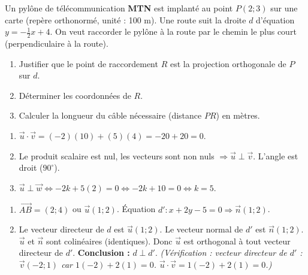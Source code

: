 \documentclass[11pt]{article}
\begin{document}
\begin{exercice}
Un pylône de télécommunication \textbf{MTN} est implanté au point $P(2; 3)$ sur une carte (repère orthonormé, unité : 100 m). Une route suit la droite $d$ d'équation $y = -\frac{1}{2}x + 4$. On veut raccorder le pylône à la route par le chemin le plus court (perpendiculaire à la route).
\begin{enumerate}
    \item Justifier que le point de raccordement $R$ est la projection orthogonale de $P$ sur $d$.
    \item Déterminer les coordonnées de $R$.
    \item Calculer la longueur du câble nécessaire (distance $PR$) en mètres.
\end{enumerate}
\end{exercice}

\begin{corrige}[Exercice 1]
\begin{enumerate}
    \item $\vec{u} \cdot \vec{v} = (-2)(10) + (5)(4) = -20 + 20 = 0$.
    \item Le produit scalaire est nul, les vecteurs sont non nuls $\Rightarrow \vec{u} \perp \vec{v}$. L'angle est droit ($90^\circ$).
    \item $\vec{u} \perp \vec{w} \iff -2k + 5(2) = 0 \iff -2k + 10 = 0 \iff k = 5$.
\end{enumerate}
\end{corrige}

\begin{corrige}[Exercice 2]
\begin{enumerate}
    \item $\overrightarrow{AB} = (2; 4)$ ou $\vec{u}(1; 2)$. Équation $d' : x + 2y - 5 = 0 \Rightarrow \vec{n}(1; 2)$.
    \item Le vecteur directeur de $d$ est $\vec{u}(1;2)$. Le vecteur normal de $d'$ est $\vec{n}(1;2)$.
    $\vec{u}$ et $\vec{n}$ sont colinéaires (identiques). Donc $\vec{u}$ est orthogonal à tout vecteur directeur de $d'$.
    \textbf{Conclusion :} $d \perp d'$.
    \emph{(Vérification : vecteur directeur de $d'$ : $\vec{v}(-2; 1)$ car $1(-2)+2(1)=0$. $\vec{u} \cdot \vec{v} = 1(-2) + 2(1) = 0$.)}
\end{enumerate}
\end{corrige}
\end{document}
